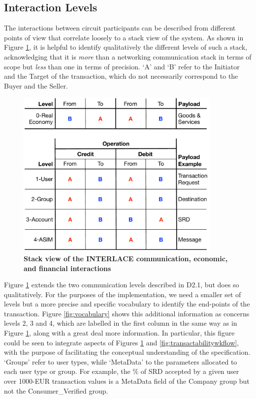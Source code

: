 \subsection{Interaction Levels}
The interactions between circuit participants can be described from different points of view that correlate loosely to a stack view of the system. As shown in Figure \ref{fig:stack}, it is helpful to identify qualitatively the different levels of such a stack, acknowledging that it is \emph{more} than a networking communication stack in terms of scope but \emph{less} than one in terms of precision. `A' and `B' refer to the Initiator and the Target of the transaction, which do not necessarily correspond to the Buyer and the Seller.

\begin{figure}[htbp]
\centering
\includegraphics[width=10cm]{Figures/stack}
\caption{\small\textbf{Stack view of the INTERLACE communication, economic, and financial  interactions}}
\label{fig:stack}
\end{figure}

Figure \ref{fig:stack} extends the two communication levels described in D2.1, but does so qualitatively. For the purposes of the implementation, we need a smaller set of levels but a more precise and specific vocabulary to identify the end-points of the transaction. Figure \ref{fig:vocabulary} shows this additional information as concerns levels 2, 3 and 4, which are labelled in the first column in the same way as in Figure \ref{fig:stack}, along with a great deal more information. In particular, this figure could be seen to integrate aspects of Figures \ref{fig:stack} and \ref{fig:transactabilitywkflow}, with the purpose of facilitating the conceptual understanding of the specification. `Groups' refer to user types, while `MetaData' to the parameters allocated to each user type or group. For example, the $\%$ of SRD accepted by a given user over 1000-EUR transaction values is a MetaData field of the Company group but not the Consumer\_Verified group.

